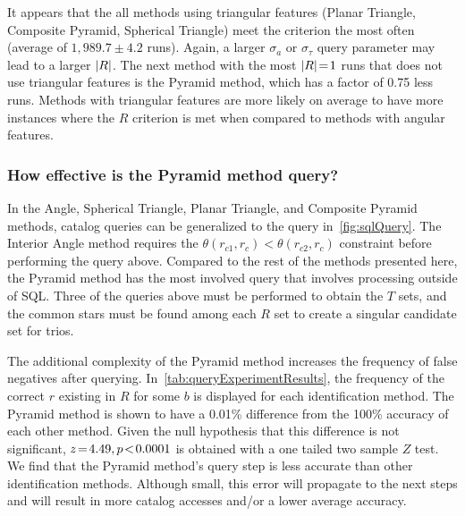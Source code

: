 It appears that the all methods using triangular features (Planar Triangle, Composite Pyramid, Spherical Triangle)
meet the criterion the most often (average of $1{,}989.7 \pm 4.2$ runs).
Again, a larger $\sigma_a$ or $\sigma_\tau$ query parameter may lead to a larger $\left| R \right|$.
The next method with the most $\left| R \right| \!=\! 1$ runs that does not use triangular features is the Pyramid method,
which has a factor of 0.75 less runs.
Methods with triangular features are more likely on average to have more instances where the $R$ criterion is met
when compared to methods with angular features.

\enlargethispage{-\baselineskip} \enlargethispage{-\baselineskip}
\subsubsection{How effective is the Pyramid method query?}
In the Angle, Spherical Triangle, Planar Triangle, and Composite Pyramid methods, catalog queries can be
generalized to the query in~\autoref{fig:sqlQuery}.
The Interior Angle method requires the $\theta(r_{c1}, r_{c})\!<\!\theta(r_{c2}, r_c)$ constraint before performing the
query above.
Compared to the rest of the methods presented here, the Pyramid method has the most involved query that involves
processing outside of SQL\@.
Three of the queries above must be performed to obtain the $T$ sets, and the common stars must be
found among each $R$ set to create a singular candidate set for trios.


The additional complexity of the Pyramid method increases the frequency of false negatives after querying.
In~\autoref{tab:queryExperimentResults}, the frequency of the correct $r$ existing in $R$ for some $b$ is displayed
for each identification method.
The Pyramid method is shown to have a 0.01\% difference from the 100\% accuracy of each other method.
Given the null hypothesis that this difference is not significant, $z \!=\! 4.49, p\!<\!0.0001$ is obtained with a
one tailed two sample $Z$ test.
We find that the Pyramid method's query step is less accurate than other identification methods.
Although small, this error will propagate to the next steps and will result in more catalog accesses and/or a lower
average accuracy.

